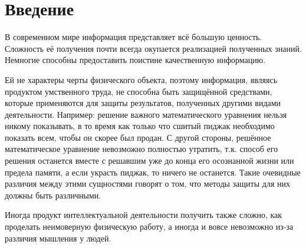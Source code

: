\section{Введение}
В современном мире информация представляет всё большую ценность.
Сложность её получения почти всегда окупается реализацией полученных знаний.
Немногие способны предоставить поистине качественную информацию.

Ей не характеры черты физического объекта,
	поэтому информация,
		являясь продуктом умственного труда,
	не способна быть защищённой средствами,
		которые применяются для защиты результатов,
			полученных другими видами деятельности.
Например: решение важного математического уравнения нельзя никому показывать,
	в то время как только что сшитый пиджак необходимо показать всем,
		чтобы он скорее был продан.
С другой стороны, решённое математическое уравнение невозможно полностью утратить,
	т.к. способ его решения останется вместе с решавшим уже до конца его осознанной жизни или предела памяти,
		а если украсть пиджак, то ничего не останется.
Такие очевидные различия между этими сущностями говорят о том,
	что методы защиты для них должны быть различными.

Иногда продукт интеллектуальной деятельности получить также сложно,
	как проделать неимоверную физическую работу,
а иногда и вовсе невозможно из-за различия мышления у людей.
